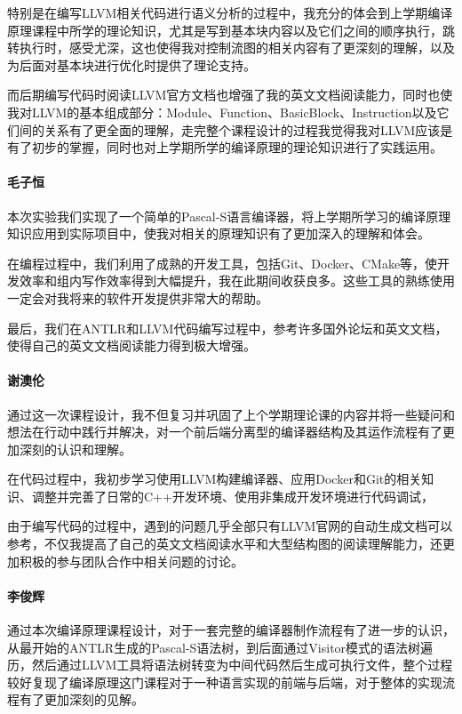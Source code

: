 \documentclass[lang=cn,11pt,a4paper,cite=authornum]{paper}
\begin{document}
特别是在编写LLVM相关代码进行语义分析的过程中，我充分的体会到上学期编译原理课程中所学的理论知识，尤其是写到基本块内容以及它们之间的顺序执行，跳转执行时，感受尤深，这也使得我对控制流图的相关内容有了更深刻的理解，以及为后面对基本块进行优化时提供了理论支持。

而后期编写代码时阅读LLVM官方文档也增强了我的英文文档阅读能力，同时也使我对LLVM的基本组成部分：Module、Function、BasicBlock、Instruction以及它们间的关系有了更全面的理解，走完整个课程设计的过程我觉得我对LLVM应该是有了初步的掌握，同时也对上学期所学的编译原理的理论知识进行了实践运用。

\paragraph{毛子恒} 本次实验我们实现了一个简单的Pascal-S语言编译器，将上学期所学习的编译原理知识应用到实际项目中，使我对相关的原理知识有了更加深入的理解和体会。

在编程过程中，我们利用了成熟的开发工具，包括Git、Docker、CMake等，使开发效率和组内写作效率得到大幅提升，我在此期间收获良多。这些工具的熟练使用一定会对我将来的软件开发提供非常大的帮助。

最后，我们在ANTLR和LLVM代码编写过程中，参考许多国外论坛和英文文档，使得自己的英文文档阅读能力得到极大增强。

\paragraph{谢澳伦} 通过这一次课程设计，我不但复习并巩固了上个学期理论课的内容并将一些疑问和想法在行动中践行并解决，对一个前后端分离型的编译器结构及其运作流程有了更加深刻的认识和理解。

在代码过程中，我初步学习使用LLVM构建编译器、应用Docker和Git的相关知识、调整并完善了日常的C++开发环境、使用非集成开发环境进行代码调试，

由于编写代码的过程中，遇到的问题几乎全部只有LLVM官网的自动生成文档可以参考，不仅我提高了自己的英文文档阅读水平和大型结构图的阅读理解能力，还更加积极的参与团队合作中相关问题的讨论。

\paragraph{李俊辉} 通过本次编译原理课程设计，对于一套完整的编译器制作流程有了进一步的认识，从最开始的ANTLR生成的Pascal-S语法树，到后面通过Visitor模式的语法树遍历，然后通过LLVM工具将语法树转变为中间代码然后生成可执行文件，整个过程较好复现了编译原理这门课程对于一种语言实现的前端与后端，对于整体的实现流程有了更加深刻的见解。
\end{document}
